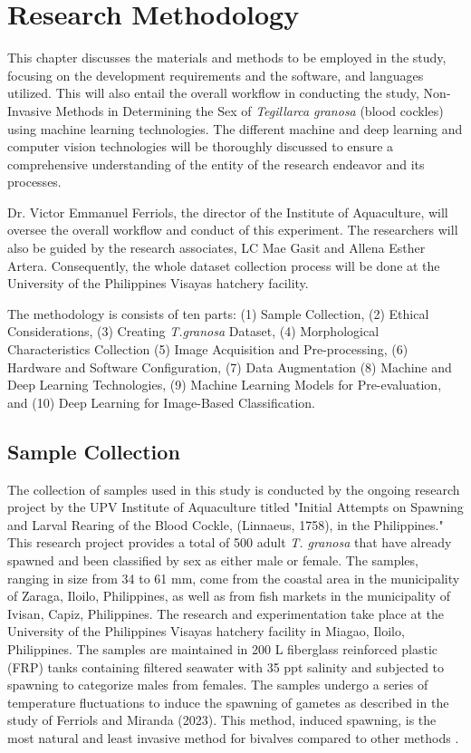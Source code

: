 \chapter{Research Methodology}
\label{sec:methodology}

This chapter discusses the materials and methods to be employed in the study, focusing on the development requirements and the software, and languages utilized. This will also entail the overall workflow in conducting the study, Non-Invasive Methods in Determining the Sex of \textit{Tegillarca granosa} (blood cockles) using machine learning technologies. The different machine and deep learning and computer vision technologies will be thoroughly discussed to ensure a comprehensive understanding of the entity of the research endeavor and its processes. 

Dr. Victor Emmanuel Ferriols, the director of the Institute of Aquaculture, will oversee the overall workflow and conduct of this experiment. The researchers will also be guided by the research associates, LC Mae Gasit and Allena Esther Artera. Consequently, the whole dataset collection process will be done at the University of the Philippines Visayas hatchery facility. 

The methodology is consists of ten parts: (1) Sample Collection, (2) Ethical Considerations, (3) Creating \textit{T.granosa} Dataset, (4) Morphological Characteristics Collection (5) Image Acquisition and Pre-processing, (6) Hardware and Software Configuration, (7) Data Augmentation (8) Machine and Deep Learning Technologies, (9) Machine Learning Models for Pre-evaluation, and (10) Deep Learning for Image-Based Classification. 



\section{Sample Collection}
\label{sec:samplecollect}
The collection of \Tgranosa samples used in this study is conducted by the ongoing research project by the UPV Institute of Aquaculture titled "Initial Attempts on Spawning and Larval Rearing of the Blood Cockle, \Tegillarcagranosa (Linnaeus, 1758), in the Philippines." This research project provides a total of 500 adult \textit{T. granosa} that have already spawned and been classified by sex as either male or female. The samples, ranging in size from 34 to 61 mm, come from the coastal area in the municipality of Zaraga, Iloilo, Philippines, as well as from fish markets in the municipality of Ivisan, Capiz, Philippines. The research and experimentation take place at the University of the Philippines Visayas hatchery facility in Miagao, Iloilo, Philippines. The samples are maintained in 200 L fiberglass reinforced plastic (FRP) tanks containing filtered seawater with 35 ppt salinity \cite{miranda2023} and subjected to spawning to categorize males from females. The samples undergo a series of temperature fluctuations to induce the spawning of gametes as described in the study of Ferriols and Miranda (2023). This method, induced spawning, is the most natural and least invasive method for bivalves compared to other methods \cite{aji}.

